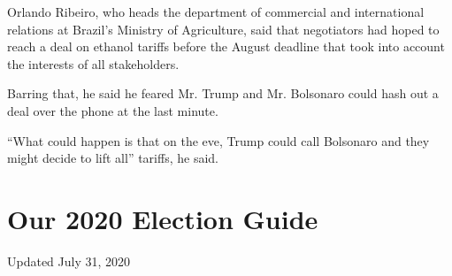 Orlando Ribeiro, who heads the department of commercial and
international relations at Brazil's Ministry of Agriculture, said that
negotiators had hoped to reach a deal on ethanol tariffs before the
August deadline that took into account the interests of all
stakeholders.

Barring that, he said he feared Mr. Trump and Mr. Bolsonaro could hash
out a deal over the phone at the last minute.

``What could happen is that on the eve, Trump could call Bolsonaro and
they might decide to lift all'' tariffs, he said.

\hypertarget{our-2020-election-guide}{%
\section{Our 2020 Election Guide}\label{our-2020-election-guide}}

Updated July 31, 2020

